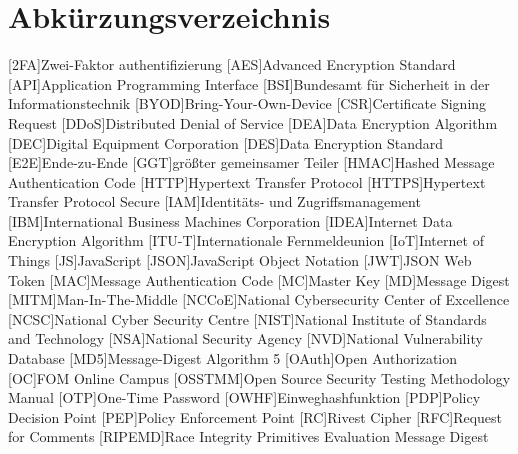 \section*{Abkürzungsverzeichnis}


\begin{acronym}
[OSSTMM]
    \itemsep0pt %
    [2FA]{Zwei-Faktor \gls{authentifizierung}}
    [AES]{Advanced Encryption Standard}
    [API]{Application Programming Interface}
    [BSI]{Bundesamt für Sicherheit in der Informationstechnik}
    [BYOD]{Bring-Your-Own-Device}
    [CSR]{Certificate Signing Request}
    [DDoS]{Distributed Denial of Service}
    [DEA]{Data Encryption Algorithm}
    [DEC]{Digital Equipment Corporation}
    [DES]{Data Encryption Standard}
    [E2E]{Ende-zu-Ende}
    [GGT]{größter gemeinsamer Teiler}
    [HMAC]{Hashed Message Authentication Code}
    [HTTP]{Hypertext Transfer Protocol}
    [\acs{HTTP}S]{Hypertext Transfer Protocol Secure}
    [IAM]{Identitäts- und Zugriffsmanagement}
    [IBM]{International Business Machines Corporation}
    [IDEA]{Internet Data Encryption Algorithm}
    [ITU-T]{Internationale Fernmeldeunion}
    [IoT]{Internet of Things}
    [JS]{JavaScript}
    [JSON]{JavaScript Object Notation}
    [JWT]{JSON Web Token}
    [MAC]{Message Authentication Code}
    [MC]{Master Key}
    [MD]{Message Digest}
    [MITM]{Man-In-The-Middle}
    [NCCoE]{National Cybersecurity Center of Excellence}
    [NCSC]{National Cyber Security Centre}
    [NIST]{National Institute of Standards and Technology}
    [NSA]{National Security Agency}
    [NVD]{National Vulnerability Database}
    [MD5]{Message-Digest Algorithm 5}
    [OAuth]{Open Authorization}
    [OC]{FOM Online Campus}
    [OSSTMM]{Open Source Security Testing Methodology Manual}
    [OTP]{One-Time Password}
    [OWHF]{Einweghashfunktion}
    [PDP]{Policy Decision Point}
    [PEP]{Policy Enforcement Point}
    [RC]{Rivest Cipher}
    [RFC]{Request for Comments}
    [RIPEMD]{Race Integrity Primitives Evaluation Message Digest}

\end{acronym}
